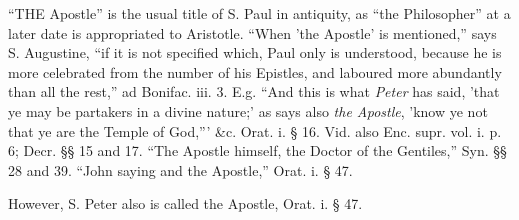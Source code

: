 
``THE
Apostle'' is the usual title of S. Paul in antiquity, as ``the
Philosopher'' at a later date is appropriated to Aristotle. ``When 'the
Apostle' is mentioned,'' says S. Augustine, ``if it is not specified
which, Paul only is understood, because he is more celebrated from the
number of his Epistles, and laboured more abundantly than all the
rest,'' ad Bonifac. iii. 3. E.g. ``And this is what \emph{Peter} has
said, 'that ye may be partakers in a divine nature;' as says also \emph{the
Apostle}, 'know ye not that ye are the Temple of God,''' \&c.
Orat. i. § 16. Vid. also Enc. supr. vol. i. p. 6; Decr. §§ 15 and
17. ``The Apostle himself, the Doctor of the Gentiles,'' Syn. §§ 28
and 39. ``John saying and the Apostle,'' Orat. i. § 47.

However, S. Peter also is called the Apostle,
Orat. i. § 47.


